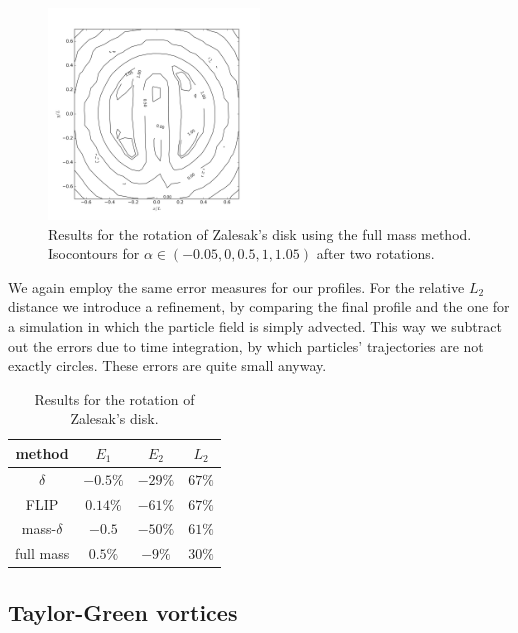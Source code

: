 \documentclass{ws-ijcm}
\begin{document}
\begin{figure}
  \centering
  \includegraphics[width=0.5\textwidth]{final_contours_ffull}
  \caption{Results for the rotation of Zalesak's disk using the full
    mass method.  Isocontours for
    $\alpha \in ( -0.05, 0 , 0.5 , 1 , 1.05 )$ after two
    rotations. \label{fig:zalesak2}}
\end{figure}


We again employ the same error measures for our profiles. For the
relative $L_2$ distance we introduce a refinement, by comparing the
final profile and the one for a simulation in which the particle field
is simply advected. This way we subtract out the errors due to time
integration, by which particles' trajectories are not exactly
circles. These errors are quite small anyway.

\begin{table}
  \centering
  \begin{tabular}{cccc}
    method & $E_1$ & $E_2$ & $L_2$
    \\
    \hline
    \hline
    $\delta$ &  $-0.5\%$ &  $-29\%$ & $67\%$
    \\
    FLIP     &  $0.14\%$ &  $-61\%$ & $67\%$
    \\
    mass-$\delta$     &  $-0.5$ &  $-50\%$ & $61\%$
    \\
    full mass     &  $0.5\%$ &  $-9\%$ & $30\%$
    \\
    \hline
  \end{tabular}
  \caption{Results for the rotation of Zalesak's disk.\label{table:Zalesak}}
\end{table}




\subsection{Taylor-Green vortices}
\label{sec:TG}
\end{document}
